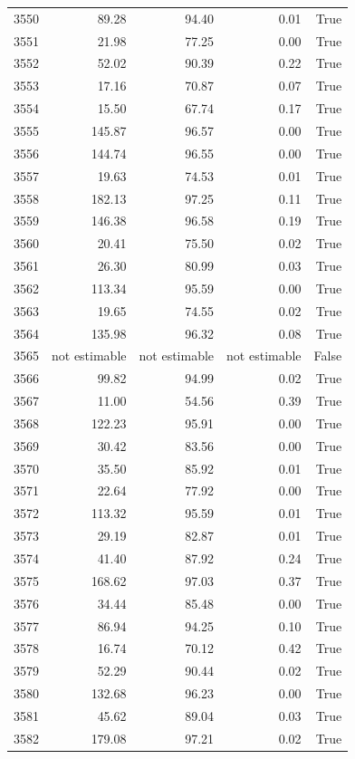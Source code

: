 \begin{longtable}{rrrrr}
3550 & 89.28 & 94.40 & 0.01 & True \\
3551 & 21.98 & 77.25 & 0.00 & True \\
3552 & 52.02 & 90.39 & 0.22 & True \\
3553 & 17.16 & 70.87 & 0.07 & True \\
3554 & 15.50 & 67.74 & 0.17 & True \\
3555 & 145.87 & 96.57 & 0.00 & True \\
3556 & 144.74 & 96.55 & 0.00 & True \\
3557 & 19.63 & 74.53 & 0.01 & True \\
3558 & 182.13 & 97.25 & 0.11 & True \\
3559 & 146.38 & 96.58 & 0.19 & True \\
3560 & 20.41 & 75.50 & 0.02 & True \\
3561 & 26.30 & 80.99 & 0.03 & True \\
3562 & 113.34 & 95.59 & 0.00 & True \\
3563 & 19.65 & 74.55 & 0.02 & True \\
3564 & 135.98 & 96.32 & 0.08 & True \\
3565 & not estimable & not estimable & not estimable & False \\
3566 & 99.82 & 94.99 & 0.02 & True \\
3567 & 11.00 & 54.56 & 0.39 & True \\
3568 & 122.23 & 95.91 & 0.00 & True \\
3569 & 30.42 & 83.56 & 0.00 & True \\
3570 & 35.50 & 85.92 & 0.01 & True \\
3571 & 22.64 & 77.92 & 0.00 & True \\
3572 & 113.32 & 95.59 & 0.01 & True \\
3573 & 29.19 & 82.87 & 0.01 & True \\
3574 & 41.40 & 87.92 & 0.24 & True \\
3575 & 168.62 & 97.03 & 0.37 & True \\
3576 & 34.44 & 85.48 & 0.00 & True \\
3577 & 86.94 & 94.25 & 0.10 & True \\
3578 & 16.74 & 70.12 & 0.42 & True \\
3579 & 52.29 & 90.44 & 0.02 & True \\
3580 & 132.68 & 96.23 & 0.00 & True \\
3581 & 45.62 & 89.04 & 0.03 & True \\
3582 & 179.08 & 97.21 & 0.02 & True \\

\end{longtable}
